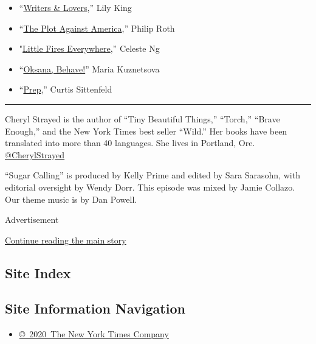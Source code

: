 \begin{itemize}
\item
  ``\href{https://www.amazon.com/Writers-Lovers-Lily-King/dp/0802148530}{Writers
  \& Lovers},'' Lily King
\item
  ``\href{https://www.amazon.com/Plot-Against-America-Philip-Roth/dp/1400079497}{The
  Plot Against America},'' Philip Roth
\item
  "\href{https://www.amazon.com/Little-Fires-Everywhere-Celeste-Ng/dp/0735224293}{Little
  Fires Everywhere},'' Celeste Ng
\item
  ``\href{https://www.amazon.com/Oksana-Behave-Novel-Maria-Kuznetsova/dp/0525511873}{Oksana,
  Behave!}'' Maria Kuznetsova
\item
  ``\href{https://www.amazon.com/Prep-Novel-Curtis-Sittenfeld/dp/081297235X}{Prep},''
  Curtis Sittenfeld
\end{itemize}

\begin{center}\rule{0.5\linewidth}{\linethickness}\end{center}

Cheryl Strayed is the author of ``Tiny Beautiful Things,'' ``Torch,''
``Brave Enough,'' and the New York Times best seller ``Wild.'' Her books
have been translated into more than 40 languages. She lives in Portland,
Ore.
\href{https://twitter.com/CherylStrayed?ref_src=twsrc\%5Egoogle\%7Ctwcamp\%5Eserp\%7Ctwgr\%5Eauthor}{@CherylStrayed}

``Sugar Calling'' is produced by Kelly Prime and edited by Sara
Sarasohn, with editorial oversight by Wendy Dorr. This episode was mixed
by Jamie Collazo. Our theme music is by Dan Powell.

Advertisement

\protect\hyperlink{after-bottom}{Continue reading the main story}

\hypertarget{site-index}{%
\subsection{Site Index}\label{site-index}}

\hypertarget{site-information-navigation}{%
\subsection{Site Information
Navigation}\label{site-information-navigation}}

\begin{itemize}
\tightlist
\item
  \href{https://help.nytimes3xbfgragh.onion/hc/en-us/articles/115014792127-Copyright-notice}{©~2020~The
  New York Times Company}
\end{itemize}

